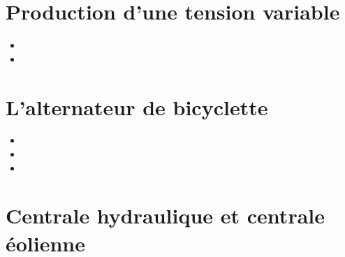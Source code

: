 \documentclass[12pt,a4paper]{article}
\date{}
\title{}
\begin{document}
	
	

\section{Production d'une tension variable}








\begin{myexos}
	\begin{itemize}
		\item {}
		\item {}
	\end{itemize}
\end{myexos}

\section{L'alternateur de bicyclette}





\begin{myexos}
	\begin{multicols}{2}
	
		\begin{itemize}
			\item {}
			\item {}
			\item {}			
		\end{itemize}
	
	\end{multicols}
\end{myexos}


\section{Centrale hydraulique et centrale éolienne}





\begin{myexos}
\end{myexos}
\end{document}
